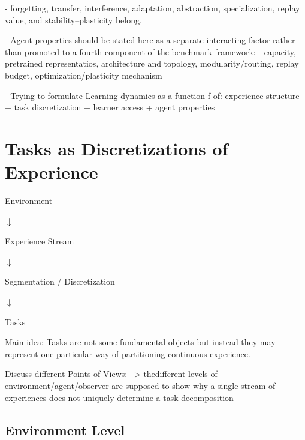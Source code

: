 \documentclass{article}
\begin{document}
                - forgetting, transfer, interference, adaptation, abstraction, specialization, replay value, and stability–plasticity belong.

                - Agent properties should be stated here as a separate interacting factor rather than promoted to a fourth component of the benchmark framework:
                    - capacity, pretrained representatios, architecture and topology, modularity/routing, replay budget, optimization/plasticity mechanism
                    
                - Trying to formulate Learning dynamics as a function f of:
                experience structure + task discretization + learner access + agent properties
        
    \section{Tasks as Discretizations of Experience}
        

        
        Environment
        
        $\downarrow$
        
        Experience Stream
        
        $\downarrow$
        
        Segmentation / Discretization
        
        $\downarrow$
        
        Tasks
        
        Main idea: Tasks are not some fundamental objects but instead they may represent one particular way of partitioning continuous experience. 
        
        Discuss different Points of Views:
        --> thedifferent levels of environment/agent/observer are supposed to show why a single stream of experiences does not uniquely determine a task decomposition

        
        \subsection{Environment Level}
        
\end{document}
